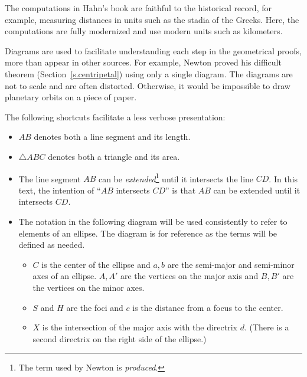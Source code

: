 The computations in Hahn's book are faithful to the historical record, for example, measuring distances in units such as the stadia of the Greeks. Here,  the computations are fully modernized and use modern units such as kilometers. 

Diagrams are used to facilitate understanding each step in the geometrical proofs, more than appear in other sources. For example, Newton proved his difficult theorem (Section~\ref{s.centripetal}) using only a single diagram. The diagrams are not to scale and are often distorted. Otherwise, it would be impossible to draw planetary orbits on a piece of paper.

The following shortcuts facilitate a less verbose presentation:
\begin{itemize}

\item $AB$ denotes both a line segment and its length.
\item $\triangle ABC$ denotes both a triangle and its area.
\item The line segment $AB$ can be \emph{extended}\footnote{The term used by Newton is \emph{produced}.} until it intersects the line $CD$. In this text, the intention of ``$AB$ intersects $CD$'' is that $AB$ can be extended until it intersects $CD$.
\begin{center}
\end{center}
\item The notation in the following diagram will be used consistently to refer to elements of an ellipse. The diagram is for reference as the terms will be defined as needed.
\begin{itemize}
\item $C$ is the center of the ellipse and $a,b$ are the semi-major and semi-minor axes of an ellipse. $A,A'$ are the vertices on the major axis and $B,B'$ are the vertices on the minor axes.
\item $S$ and $H$ are the foci and $c$ is the distance from a focus to the center.
\item $X$ is the intersection of the major axis with the directrix $d$. (There is a second directrix on the right side of the ellipse.)
\end{itemize}
\end{itemize}

